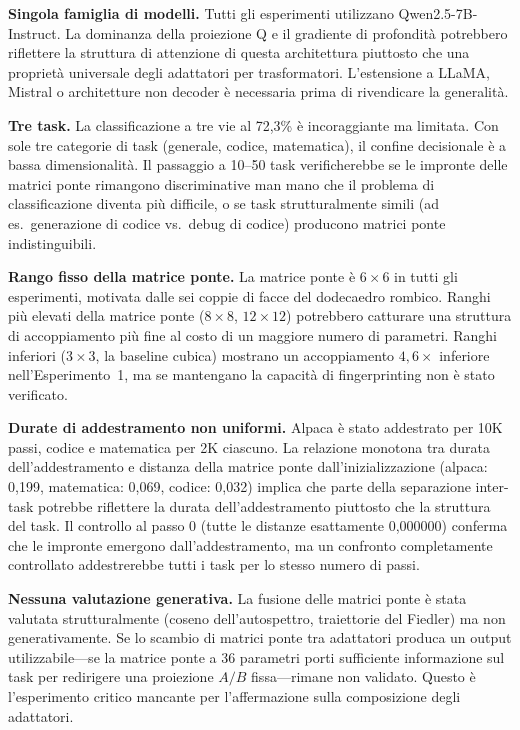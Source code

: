 \documentclass[11pt]{article}
\begin{document}
\textbf{Singola famiglia di modelli.} Tutti gli esperimenti utilizzano
Qwen2.5-7B-Instruct. La dominanza della proiezione Q e il gradiente di
profondit\`a potrebbero riflettere la struttura di attenzione di questa
architettura piuttosto che una propriet\`a universale degli adattatori
per trasformatori. L'estensione a LLaMA, Mistral o architetture non
decoder \`e necessaria prima di rivendicare la generalit\`a.

\textbf{Tre task.} La classificazione a tre vie al 72,3\% \`e
incoraggiante ma limitata. Con sole tre categorie di task (generale,
codice, matematica), il confine decisionale \`e a bassa dimensionalit\`a.
Il passaggio a 10--50 task verificherebbe se le impronte delle matrici
ponte rimangono discriminative man mano che il problema di
classificazione diventa pi\`u difficile, o se task strutturalmente simili
(ad es.\ generazione di codice vs.\ debug di codice) producono matrici
ponte indistinguibili.

\textbf{Rango fisso della matrice ponte.} La matrice ponte \`e
$6 \times 6$ in tutti gli esperimenti, motivata dalle sei coppie di
facce del dodecaedro rombico. Ranghi pi\`u elevati della matrice ponte
($8 \times 8$, $12 \times 12$) potrebbero catturare una struttura di
accoppiamento pi\`u fine al costo di un maggiore numero di parametri.
Ranghi inferiori ($3 \times 3$, la baseline cubica) mostrano un
accoppiamento $4{,}6\times$ inferiore nell'Esperimento~1, ma se
mantengano la capacit\`a di fingerprinting non \`e stato verificato.

\textbf{Durate di addestramento non uniformi.} Alpaca \`e stato
addestrato per 10K passi, codice e matematica per 2K ciascuno. La
relazione monotona tra durata dell'addestramento e distanza della
matrice ponte dall'inizializzazione (alpaca: 0,199, matematica: 0,069,
codice: 0,032) implica che parte della separazione inter-task potrebbe
riflettere la durata dell'addestramento piuttosto che la struttura del
task. Il controllo al passo 0 (tutte le distanze esattamente 0,000000)
conferma che le impronte emergono dall'addestramento, ma un confronto
completamente controllato addestrerebbe tutti i task per lo stesso
numero di passi.

\textbf{Nessuna valutazione generativa.} La fusione delle matrici ponte
\`e stata valutata strutturalmente (coseno dell'autospettro, traiettorie
del Fiedler) ma non generativamente. Se lo scambio di matrici ponte tra
adattatori produca un output utilizzabile---se la matrice ponte a 36
parametri porti sufficiente informazione sul task per redirigere una
proiezione $A/B$ fissa---rimane non validato. Questo \`e l'esperimento
critico mancante per l'affermazione sulla composizione degli adattatori.
\end{document}
